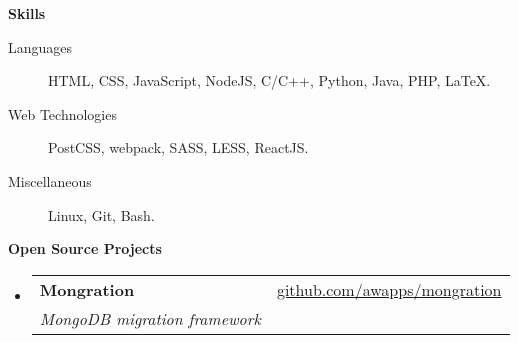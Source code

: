 \documentclass[letterpaper,11pt]{article}
\makeatletter
\newcommand{\resheading}[1]{{\large \colorbox{mygrey}{\begin{minipage}{\textwidth}{\textbf{#1 \vphantom{p\^{E}}}}\end{minipage}}}}
\newcommand{\ressubheading}[4]{
\begin{tabular*}{7.0in}{l@{\extracolsep{\fill}}r}
    \textbf{#1} & #2 \\
    \textit{#3} & \textit{#4} \\
\end{tabular*}\vspace{-6pt}}
\makeatother
\begin{document}
    \resheading{Skills}
    \begin{description}
        \item[Languages]
            HTML, CSS, JavaScript, NodeJS, C/C++, Python, Java, PHP, \LaTeX.
        \item[Web Technologies]
            PostCSS, webpack, SASS, LESS, ReactJS.
        \item[Miscellaneous]
            Linux, Git, Bash.
    \end{description}

    \resheading{Open Source Projects}
    \begin{itemize}
        \item
            \ressubheading
                {Mongration}
                {\href{https://github.com/awapps/mongration}{github.com/awapps/mongration}}
                {MongoDB migration framework}
                {}
    \end{itemize}
\end{document}
